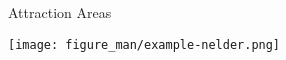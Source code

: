 \documentclass[11pt,compress,t,notes=noshow, xcolor=table]{beamer}
\begin{document}
\begin{vbframe}{Attraction Areas}

\begin{center}
\texttt{[image: figure\_man/example-nelder.png]}
\end{center}




\end{vbframe}
\end{document}

